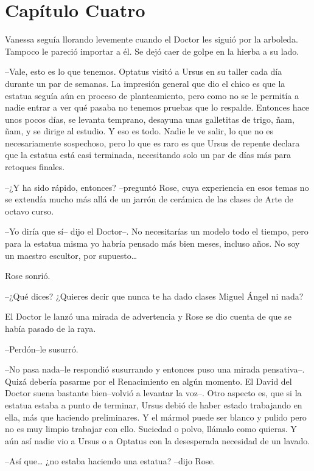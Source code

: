 \chapter*{Capítulo Cuatro}

Vanessa seguía llorando levemente cuando el Doctor les siguió por la
arboleda. Tampoco le pareció importar a él. Se dejó caer de golpe en la
hierba a su lado.

--Vale, esto es lo que tenemos. Optatus visitó a Ursus en su taller cada
día durante un par de semanas. La impresión general que dio el chico es
que la estatua seguía aún en proceso de planteamiento, pero como no se
le permitía a nadie entrar a ver qué pasaba no tenemos pruebas que lo
respalde. Entonces hace unos pocos días, se levanta temprano, desayuna
unas galletitas de trigo, ñam, ñam, y se dirige al estudio. Y eso es
todo. Nadie le ve salir, lo que no es necesariamente sospechoso, pero lo
que es raro es que Ursus de repente declara que la estatua está casi
terminada, necesitando solo un par de días más para retoques finales.

--¿Y ha sido rápido, entonces? --preguntó Rose, cuya experiencia en esos
temas no se extendía mucho más allá de un jarrón de cerámica de las
clases de Arte de octavo curso.

--Yo diría que sí-- dijo el Doctor--. No necesitarías un modelo todo el
tiempo, pero para la estatua misma yo habría pensado más bien meses,
incluso años. No soy un maestro escultor, por supuesto\ldots{}

Rose sonrió.

--¿Qué dices? ¿Quieres decir que nunca te ha dado clases Miguel Ángel ni
nada?

El Doctor le lanzó una mirada de advertencia y Rose se dio cuenta de que
se había pasado de la raya.

--Perdón--le susurró.

--No pasa nada--le respondió susurrando y entonces puso una mirada
pensativa--. Quizá debería pasarme por el Renacimiento en algún momento.
El David del Doctor suena bastante bien--volvió a levantar la voz--.
Otro aspecto es, que si la estatua estaba a punto de terminar, Ursus
debió de haber estado trabajando en ella, más que haciendo preliminares.
Y el mármol puede ser blanco y pulido pero no es muy limpio trabajar con
ello. Suciedad o polvo, llámalo como quieras. Y aún así nadie vio a
Ursus o a Optatus con la desesperada necesidad de un lavado.

--Así que\ldots{} ¿no estaba haciendo una estatua? --dijo Rose.

